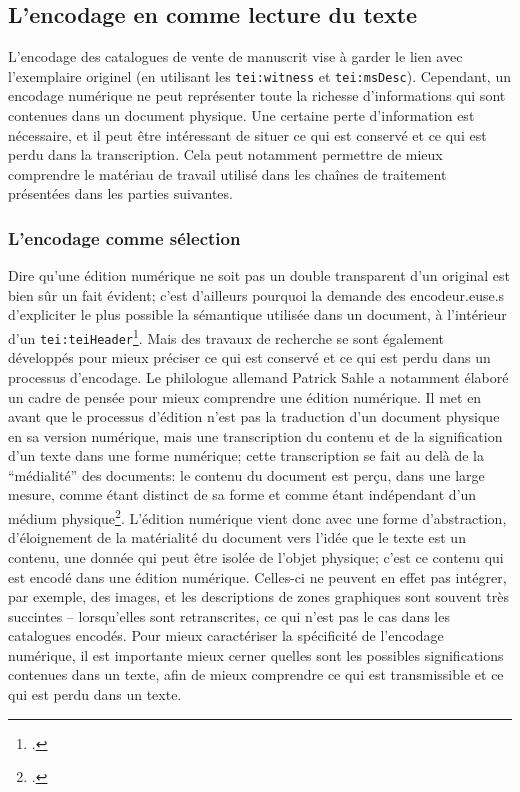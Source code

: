 \subsection{L'encodage en \tei{} comme lecture du texte}
L'encodage des catalogues de vente de manuscrit vise à garder le lien avec l'exemplaire originel (en utilisant les \texttt{tei:witness} et \texttt{tei:msDesc}). Cependant, un encodage numérique ne peut représenter toute la richesse d'informations qui sont contenues dans un document physique. Une certaine perte d'information est nécessaire, et il peut être intéressant de situer ce qui est conservé et ce qui est perdu dans la transcription. Cela peut notamment permettre de mieux comprendre le matériau de travail utilisé dans les chaînes de traitement présentées dans les parties suivantes.

\subsubsection{L'encodage comme sélection}
Dire qu'une édition numérique ne soit pas un double transparent d'un original est bien sûr un fait évident; c'est d'ailleurs pourquoi la \tei{} demande des encodeur.euse.s d'expliciter le plus possible la sémantique utilisée dans un document, à l'intérieur d'un \texttt{tei:teiHeader}\footcite[p. 104]{burnard_how_2019}. Mais des travaux de recherche se sont également développés pour mieux préciser ce qui est conservé et ce qui est perdu dans un processus d'encodage. Le philologue allemand Patrick Sahle a notamment élaboré un cadre de pensée pour mieux comprendre une édition numérique. Il met en avant que le processus d'édition n'est pas la traduction d'un document physique en sa version numérique, mais une transcription du contenu et de la signification d'un texte dans une forme numérique; cette transcription se fait au delà de la \enquote{médialité} des documents: le contenu du document est perçu, dans une large mesure, comme étant distinct de sa forme et comme étant indépendant d'un médium physique\footcite{sahle_digital_2016}. L'édition numérique vient donc avec une forme d'abstraction, d'éloignement de la matérialité du document vers l'idée que le texte est un contenu, une donnée qui peut être isolée de l'objet physique; c'est ce contenu qui est encodé dans une édition numérique. Celles-ci ne peuvent en effet pas intégrer, par exemple, des images, et les descriptions de zones graphiques sont souvent très succintes -- lorsqu'elles sont retranscrites, ce qui n'est pas le cas dans les catalogues encodés. Pour mieux caractériser la spécificité de l'encodage numérique, il est importante mieux cerner quelles sont les possibles significations contenues dans un texte, afin de mieux comprendre ce qui est transmissible et ce qui est perdu dans un texte. 

